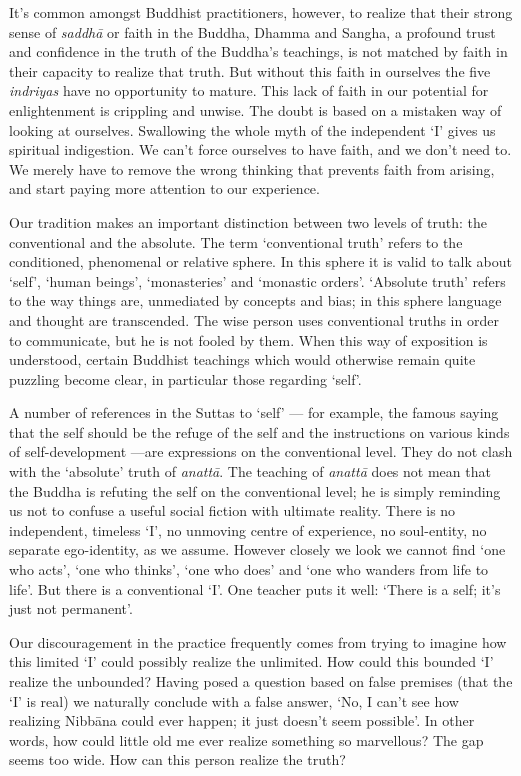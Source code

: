 It's common amongst Buddhist practitioners, however, to realize that
their strong sense of \emph{saddhā} or faith in the Buddha, Dhamma and
Sangha, a profound trust and confidence in the truth of the Buddha's
teachings, is not matched by faith in their capacity to realize that
truth. But without this faith in ourselves the five \emph{indriyas} have
no opportunity to mature. This lack of faith in our potential for
enlightenment is crippling and unwise. The doubt is based on a mistaken
way of looking at ourselves. Swallowing the whole myth of the
independent `I' gives us spiritual indigestion. We can't force ourselves
to have faith, and we don't need to. We merely have to remove the wrong
thinking that prevents faith from arising, and start paying more
attention to our experience.

Our tradition makes an important distinction between two levels of
truth: the conventional and the absolute. The term `conventional truth'
refers to the conditioned, phenomenal or relative sphere. In this sphere
it is valid to talk about `self', `human beings', `monasteries' and
`monastic orders'. `Absolute truth' refers to the way things are,
unmediated by concepts and bias; in this sphere language and thought are
transcended. The wise person uses conventional truths in order to
communicate, but he is not fooled by them. When this way of exposition
is understood, certain Buddhist teachings which would otherwise remain
quite puzzling become clear, in particular those regarding `self'.

A number of references in the Suttas to `self' --- for example, the
famous saying that the self should be the refuge of the self and the
instructions on various kinds of self-development ---are expressions on
the conventional level. They do not clash with the `absolute' truth of
\emph{anattā}. The teaching of \emph{anattā} does not mean that the
Buddha is refuting the self on the conventional level; he is simply
reminding us not to confuse a useful social fiction with ultimate
reality. There is no independent, timeless `I', no unmoving centre of
experience, no soul-entity, no separate ego-identity, as we assume.
However closely we look we cannot find `one who acts', `one who thinks',
`one who does' and `one who wanders from life to life'. But there is a
conventional `I'. One teacher puts it well: `There is a self; it's just
not permanent'.

Our discouragement in the practice frequently comes from trying to
imagine how this limited `I' could possibly realize the unlimited. How
could this bounded `I' realize the unbounded? Having posed a question
based on false premises (that the `I' is real) we naturally conclude
with a false answer, `No, I can't see how realizing Nibbāna could ever
happen; it just doesn't seem possible'. In other words, how could little
old me ever realize something so marvellous? The gap seems too wide. How
can this person realize the truth?

